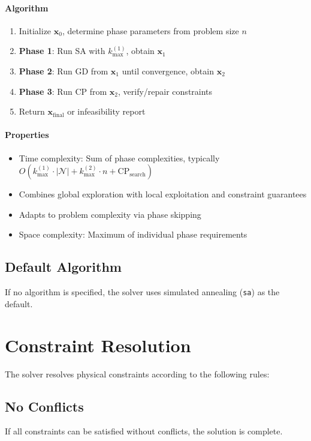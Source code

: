 \paragraph{Algorithm}
\begin{enumerate}
\item Initialize $\mathbf{x}_0$, determine phase parameters from problem size $n$
\item \textbf{Phase 1}: Run SA with $k_{\max}^{(1)}$, obtain $\mathbf{x}_1$
\item \textbf{Phase 2}: Run GD from $\mathbf{x}_1$ until convergence, obtain $\mathbf{x}_2$
\item \textbf{Phase 3}: Run CP from $\mathbf{x}_2$, verify/repair constraints
\item Return $\mathbf{x}_{\text{final}}$ or infeasibility report
\end{enumerate}

\paragraph{Properties}
\begin{itemize}
\item Time complexity: Sum of phase complexities, typically $O(k_{\max}^{(1)} \cdot |\mathcal{N}| + k_{\max}^{(2)} \cdot n + \text{CP}_{\text{search}})$
\item Combines global exploration with local exploitation and constraint guarantees
\item Adapts to problem complexity via phase skipping
\item Space complexity: Maximum of individual phase requirements
\end{itemize}

\subsection{Default Algorithm}
If no algorithm is specified, the solver uses simulated annealing (\texttt{sa}) as the default.

\section{Constraint Resolution}
The solver resolves physical constraints according to the following rules:

\subsection{No Conflicts}
If all constraints can be satisfied without conflicts, the solution is complete.

